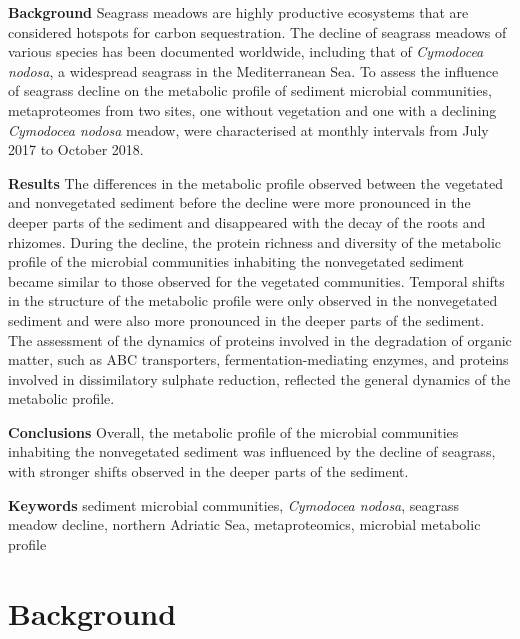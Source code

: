 \documentclass[
  12 pt,
]{article}
\begin{document}
{\setlength{\parskip}{0pt}

\noindent
\textbf{Background} Seagrass meadows are highly productive ecosystems that are considered hotspots for carbon sequestration. The decline of seagrass meadows of various species has been documented worldwide, including that of \emph{Cymodocea nodosa}, a widespread seagrass in the Mediterranean Sea. To assess the influence of seagrass decline on the metabolic profile of sediment microbial communities, metaproteomes from two sites, one without vegetation and one with a declining \emph{Cymodocea nodosa} meadow, were characterised at monthly intervals from July 2017 to October 2018.

\noindent
\textbf{Results} The differences in the metabolic profile observed between the vegetated and nonvegetated sediment before the decline were more pronounced in the deeper parts of the sediment and disappeared with the decay of the roots and rhizomes. During the decline, the protein richness and diversity of the metabolic profile of the microbial communities inhabiting the nonvegetated sediment became similar to those observed for the vegetated communities. Temporal shifts in the structure of the metabolic profile were only observed in the nonvegetated sediment and were also more pronounced in the deeper parts of the sediment. The assessment of the dynamics of proteins involved in the degradation of organic matter, such as ABC transporters, fermentation-mediating enzymes, and proteins involved in dissimilatory sulphate reduction, reflected the general dynamics of the metabolic profile.

\noindent
\textbf{Conclusions} Overall, the metabolic profile of the microbial communities inhabiting the nonvegetated sediment was influenced by the decline of seagrass, with stronger shifts observed in the deeper parts of the sediment.

}

\noindent
\textbf{Keywords} sediment microbial communities, \emph{Cymodocea nodosa}, seagrass meadow decline, northern Adriatic Sea, metaproteomics, microbial metabolic profile

\newpage

\hypertarget{background}{%
\section{Background}\label{background}}
\end{document}
